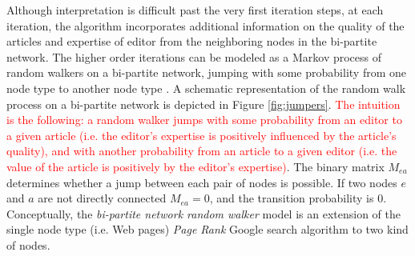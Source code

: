 Although interpretation is difficult past the very first iteration steps, at each iteration, the algorithm incorporates additional information on the quality of the articles and expertise of editor from the neighboring nodes in the bi-partite network. The higher order iterations 
%
%
can be modeled as a Markov process of random walkers on a bi-partite network, jumping with some probability from one node type to another node type \cite{caldarelli2012network}. A schematic representation of the random walk process on a bi-partite network is depicted in Figure \ref{fig:jumpers}. \textcolor{red}{The intuition is the following: a random walker jumps with some probability from an editor to a given article (i.e. the editor's expertise is positively influenced by the article's quality), and with another probability from an article to a given editor (i.e. the value of the article is positively by the editor's expertise)}. The binary matrix $M_{ea}$ determines whether a jump between each pair of nodes is possible. If two nodes $e$ and $a$ are not directly connected $M_{ea} = 0$, and the transition probability is 0. Conceptually, the {\it bi-partite network random walker} model is an extension of the single node type (i.e. Web pages) {\it Page Rank} Google search algorithm \cite{page1999pagerank,kleinberg1999} to two kind of nodes.

